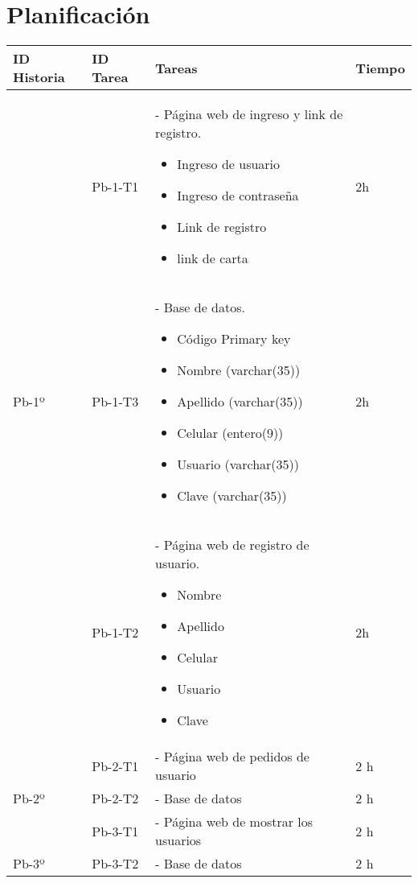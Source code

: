 \chapter{Planificación}

\begin{table}[htbp]
	\begin{center}
		\begin{tabular}{| p{2.0cm}|p{2.0cm} | p{5.5 cm} | p{3.0cm}| }
			\hline
			\centering\textbf{ID Historia} & \centering\textbf{ID Tarea}& \textbf{Tareas} & \textbf{Tiempo} 
			
			\\\hline
			
			 & \centering Pb-1-T1 & - Página web de ingreso y link de registro.
			 	 \begin{itemize}	\item Ingreso de usuario 
									\item Ingreso de contraseña	
									\item Link de registro 
									\item link de carta\end{itemize}	& 2h \\

			\centering Pb-1º & \centering Pb-1-T3 & - Base de datos.
			\begin{itemize} 
				\item Código Primary key  
				\item Nombre (varchar(35))
				\item Apellido (varchar(35))
				\item Celular (entero(9)) 
				\item Usuario (varchar(35))
				\item Clave (varchar(35)) 
			\end{itemize} & 2h
			\\ & \centering Pb-1-T2  & - Página web de registro de usuario.
			\begin{itemize}
				\item Nombre
				\item Apellido
				\item Celular
				\item Usuario
				\item Clave
			\end{itemize}   & 2h
			\\\hline
			 & \centering Pb-2-T1 & - Página web de pedidos de usuario & 2 h
			\\
			\centering Pb-2º
			& \centering Pb-2-T2 & - Base de datos & 2 h
			
			\\\hline
			& \centering Pb-3-T1 & - Página web de mostrar los usuarios & 2 h
			\\
			\centering Pb-3º
			& \centering Pb-3-T2 & - Base de datos & 2 h
			
			\\\hline

		\end{tabular}
	\end{center}
\end{table}